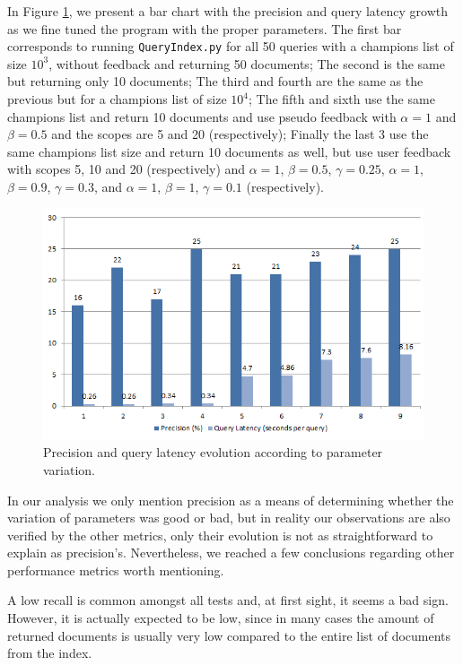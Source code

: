 \documentclass[12pt]{article}
\begin{document}
In Figure \ref{fig:precisionbarchart}, we present a bar chart with the precision and
query latency growth as we fine tuned the program with the proper parameters.
The first bar corresponds to running \texttt{QueryIndex.py} for all 50 queries with 
a champions list of size $10^3$, without feedback and returning 50 documents;
The second is the same but returning only 10 documents;
The third and fourth are the same as the previous but for a champions list of size $10^4$;
The fifth and sixth use the same champions list and return 10 documents and use pseudo
feedback with $\alpha=1$ and $\beta=0.5$ and the scopes are 5 and 20 (respectively);
Finally the last 3 use the same champions list size and return 10 documents as well, but use
user feedback with scopes 5, 10 and 20 (respectively) and $\alpha=1$, $\beta=0.5$, $\gamma=0.25$,
$\alpha=1$, $\beta=0.9$, $\gamma=0.3$, and $\alpha=1$, $\beta=1$, $\gamma=0.1$ (respectively).

\begin{figure}[h!]
\includegraphics[width=\linewidth]{BarChart.png}
\caption{Precision and query latency evolution according to parameter variation.}
\label{fig:precisionbarchart}
\end{figure}

\newpage
In our analysis we only mention precision as a means of determining whether 
the variation of parameters was good or bad, but in reality our observations 
are also verified by the other metrics, only their evolution is not as 
straightforward to explain as precision's.
Nevertheless, we reached a few conclusions regarding other performance metrics
worth mentioning.

A low recall is common amongst all tests and, at first sight, it seems a bad sign.
However, it is actually expected to be low, since in many cases the amount of 
returned documents is usually very low compared to the entire list of documents 
from the index.
\end{document}
